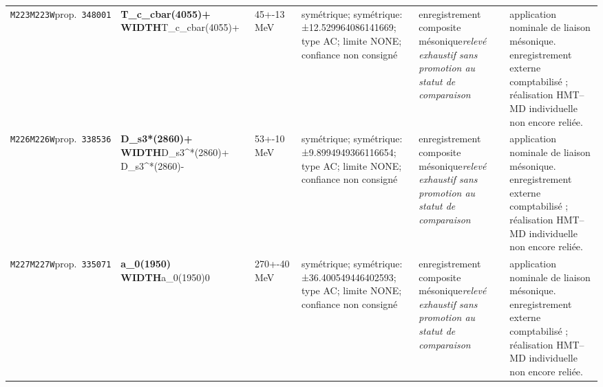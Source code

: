 \begin{landscape}
\begin{longtable}{L{1.85cm}L{4.45cm}L{2.35cm}L{4.05cm}L{3.35cm}L{7.15cm}}
\texttt{M223}\newline \texttt{M223W}\newline prop.\ \texttt{348001} & \textbf{T\_\allowbreak{}c\_\allowbreak{}cbar(4055)+ WIDTH}\newline T\_\allowbreak{}c\_\allowbreak{}cbar(4055)+ & 45+-13\,MeV & symétrique; symétrique: ±12.529964086141669; type AC; limite NONE; confiance non consigné & enregistrement composite mésonique\newline \emph{relevé exhaustif sans promotion au statut de comparaison} & application nominale de liaison mésonique. enregistrement externe comptabilisé ; réalisation HMT--MD individuelle non encore reliée. \\
\texttt{M226}\newline \texttt{M226W}\newline prop.\ \texttt{338536} & \textbf{D\_\allowbreak{}s3*(2860)+ WIDTH}\newline D\_\allowbreak{}s3\textasciicircum{}*(2860)+ \textbar{}\allowbreak{} D\_\allowbreak{}s3\textasciicircum{}*(2860)- & 53+-10\,MeV & symétrique; symétrique: ±9.8994949366116654; type AC; limite NONE; confiance non consigné & enregistrement composite mésonique\newline \emph{relevé exhaustif sans promotion au statut de comparaison} & application nominale de liaison mésonique. enregistrement externe comptabilisé ; réalisation HMT--MD individuelle non encore reliée. \\
\texttt{M227}\newline \texttt{M227W}\newline prop.\ \texttt{335071} & \textbf{a\_\allowbreak{}0(1950) WIDTH}\newline a\_\allowbreak{}0(1950)0 & 270+-40\,MeV & symétrique; symétrique: ±36.400549446402593; type AC; limite NONE; confiance non consigné & enregistrement composite mésonique\newline \emph{relevé exhaustif sans promotion au statut de comparaison} & application nominale de liaison mésonique. enregistrement externe comptabilisé ; réalisation HMT--MD individuelle non encore reliée. \\

\end{longtable}
\end{landscape}
